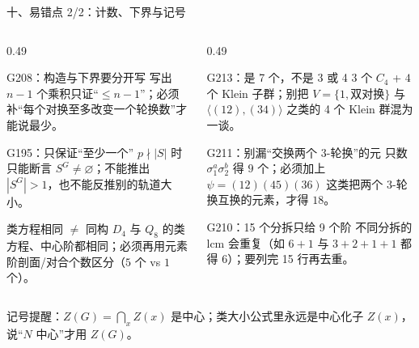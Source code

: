 \documentclass[aspectratio=169,10pt,fontset=none]{ctexbeamer}
\begin{document}
\begin{frame}[t]{十、易错点 2/2：计数、下界与记号}
  \begin{columns}[T,onlytextwidth]
    \begin{column}{0.49\textwidth}
      \begin{alertblock}{\footnotesize G208：构造与下界要分开写}
        \scriptsize
        写出 $n-1$ 个乘积只证“$\le n-1$”；必须补“每个对换至多改变一个轮换数”才能说最少。
      \end{alertblock}
      \begin{alertblock}{\footnotesize G195：只保证“至少一个”}
        \scriptsize
        $p\nmid|S|$ 时只能断言 $S^G\ne\varnothing$；不能推出 $|S^G|>1$，也不能反推别的轨道大小。
      \end{alertblock}
      \begin{alertblock}{\footnotesize 类方程相同 $\ne$ 同构}
        \scriptsize
        $D_4$ 与 $Q_8$ 的类方程、中心阶都相同；必须再用元素阶剖面/对合个数区分（$5$ 个 vs $1$ 个）。
      \end{alertblock}
    \end{column}
    \begin{column}{0.49\textwidth}
      \begin{alertblock}{\footnotesize G213：是 7 个，不是 3 或 4}
        \scriptsize
        $3$ 个 $C_4$ + $4$ 个 Klein 子群；别把 $V=\{1,\text{双对换}\}$ 与 $\langle(12),(34)\rangle$ 之类的 4 个 Klein 群混为一谈。
      \end{alertblock}
      \begin{alertblock}{\footnotesize G211：别漏“交换两个 3-轮换”的元}
        \scriptsize
        只数 $\sigma_1^a\sigma_2^b$ 得 $9$ 个；必须加上 $\psi=(12)(45)(36)$ 这类把两个 3-轮换互换的元素，才得 $18$。
      \end{alertblock}
      \begin{alertblock}{\footnotesize G210：15 个分拆只给 9 个阶}
        \scriptsize
        不同分拆的 lcm 会重复（如 $6+1$ 与 $3+2+1+1$ 都得 $6$）；要列完 15 行再去重。
      \end{alertblock}
    \end{column}
  \end{columns}
  \vspace{0.1em}
  {\scriptsize\color{ink!70} 记号提醒：$Z(G)=\bigcap_x Z(x)$ 是中心；类大小公式里永远是中心化子 $Z(x)$，说“$N$ 中心”才用 $Z(G)$。}
\end{frame}
\end{document}
